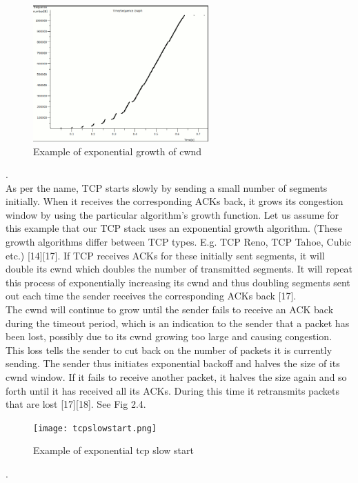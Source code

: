 \documentclass{uathesis}
\begin{document}
\begin{figure}[h]
    \centering
    \includegraphics[width=0.6\textwidth]{cwndGrowth.png}
    \caption{Example of exponential growth of cwnd}
    \label{fig:cwndGrowth}
\end{figure}.
\\
As per the name, TCP starts slowly by sending a small number of segments initially. When it receives the corresponding ACKs back, it grows its congestion window by using the particular algorithm's growth function. Let us assume for this example that our TCP stack uses an exponential growth algorithm. (These growth algorithms differ between TCP types. E.g. TCP Reno, TCP Tahoe, Cubic etc.) [14][17].  If TCP receives ACKs for these initially sent segments, it will double its cwnd which doubles the number of transmitted segments. It will repeat this process of exponentially increasing its cwnd and thus doubling segments sent out each time the sender receives the corresponding ACKs back [17].\\

The cwnd will continue to grow until the sender fails to receive an ACK back during the timeout period, which is an indication to the sender that a packet has been lost, possibly due to its cwnd growing too large and causing congestion. This loss tells the sender to cut back on the number of packets it is currently sending. The sender thus initiates exponential backoff and halves the size of its cwnd window. If it fails to receive another packet, it halves the size again and so forth until it has received all its ACKs. During this time it retransmits packets that are lost [17][18].
See Fig 2.4.
\\
\begin{figure}[h]
    \centering
    \texttt{[image: tcpslowstart.png]}
    \caption{Example of exponential tcp slow start}
    \label{fig:tcp slow start}
\end{figure}.
\\
\end{document}
